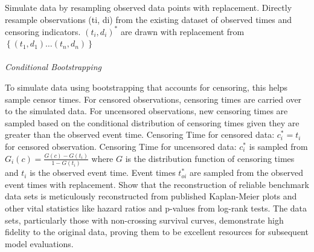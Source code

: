 \par \noindent Simulate data by resampling observed data points with replacement. Directly resample observations (ti, di) from the existing dataset of observed times and censoring indicators. \((t_{i}, d_{i})^{*}\) are drawn with replacement from \(\left\{ (t_{1}, d_{1}) \dots (t_{n}, d_{n})\right\}\)
\\\\
\textit{Conditional Bootstrapping}
\par \noindent To simulate data using bootstrapping that accounts for censoring, this helps sample censor times. For censored observations, censoring times are carried over to the simulated data. For uncensored observations, new censoring times are sampled based on the conditional distribution of censoring times given they are greater than the observed event time. Censoring Time for censored data: \(c_{i}^{*} = t_{i}\) for censored observation. Censoring Time for uncensored data: \(c_{i}^{*}\) is sampled from \(G_{i}(c) = \frac{G(c)-G(t_{i})}{1-G(t_{i})}\) where \(G\) is the distribution function of censoring times and \(t_{i}\) is the observed event time. Event times \(t^{*}_{oi}\) are sampled from the observed event times with replacement. \parencite{thurow_how_2023} Show that the reconstruction of reliable benchmark data sets is meticulously reconstructed from published Kaplan-Meier plots and other vital statistics like hazard ratios and p-values from log-rank tests. The data sets, particularly those with non-crossing survival curves, demonstrate high fidelity to the original data, proving them to be excellent resources for subsequent model evaluations.
